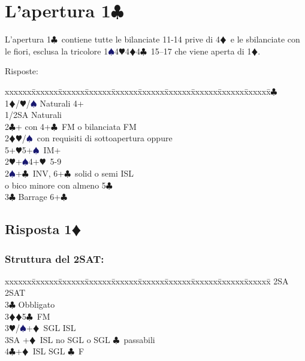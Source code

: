 \documentclass[a4paper,italian]{article}
\newcommand{\BC}{\textcolor{OliveGreen}{$\clubsuit$}}
\newcommand{\BD}{\textcolor{RedOrange}{$\vardiamondsuit$}}
\newcommand{\BH}{\textcolor{Red2}{$\varheartsuit${}}}
\newcommand{\BS}{\textcolor{MidnightBlue}{$\spadesuit${}}}
\newcommand{\pdfc}{\texorpdfstring{\BC{}}{C}}
\newcommand{\pdfd}{\texorpdfstring{\BD{}}{D}}
\newenvironment{bidtable}
{\begin{tabbing}

    xxxxxx\=xxxxxx\=xxxxxx\=xxxxxx\=xxxxxx\=xxxxxx\=xxxxxx\=xxxxxx\=xxxxxx\=xxxxxx\=\kill}
{\end{tabbing} }%
\begin{document}
                                \section{L'apertura 1\pdfc}
                                \begin{multicols}{2}
                                    L'apertura 1\BC\ contiene tutte le bilanciate 11-14 prive di 4\BD\ e le sbilanciate con le fiori, esclusa la tricolore 1\BS 4\BH 4\BD 4\BC\ 15--17
                                    che viene aperta di 1\BD .

                                    Risposte:
                                    \begin{bidtable}
                                        1\BC\+\\
                                        1\BD/\BH/\BS \> Naturali 4+\\
                                        1/2SA \> Naturali\\
                                        2\BC {}+ con 4+\BC\ FM o bilanciata FM\\
                                        2\BD {}\BH /\BS\ con requisiti di sottoapertura oppure\+\\ 5+\BH 5+\BS\ IM+\-\\
                                        2\BH {}+\BS 4+\BH\ 5-9\\
                                        2\BS {}+\BC\ INV, 6+\BC\ solid o semi ISL \+\\ o bico minore con almeno 5\BC\-\\
                                        3\BC \> Barrage 6+\BC \-
                                    \end{bidtable}
                                    \subsection{Risposta 1\pdfd}

                                    \subsubsection{Struttura del 2SAT:}
                                    \begin{bidtable}
                                        2SA \> 2SAT\+\\
                                        3\BC \> Obbligato\+\\
                                        3\BD {}\BD 5\BC\ FM\\
                                        3\BH/\BS {}+\BD\ SGL ISL\\
                                        3SA +\BD\ ISL no SGL o SGL \BC\ passabili\\
                                        4\BC {}+\BD\ ISL SGL \BC\ F\-\-
                                    \end{bidtable}

\end{multicols}
\end{document}
